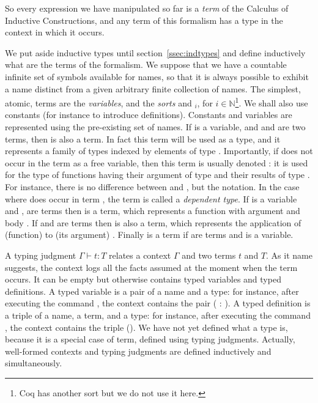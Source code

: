 So every expression we have manipulated so far is a \emph{term} of the
Calculus of Inductive Constructions, and any term of this formalism
has a type in the context in which it occurs.

We put aside inductive types until section~\ref{ssec:indtypes} and define
inductively what are the terms of the formalism. We suppose that we
have a countable infinite set of symbols available for names, so that it is
always possible to exhibit a name distinct from a given arbitrary
finite collection of names. The simplest, atomic, terms are the
\emph{variables}, and the \emph{sorts}  and $_i$, for
$i \in \mathbb{N}$\footnote{Coq has
another sort  but we do not use it here.}. We shall also
use constants (for instance to introduce definitions). Constants and
variables are represented using the pre-existing set of names. If  is a
variable, and  and  are two terms, then  is
also a term. In fact this term will be used as a type, and it
represents a family of types  indexed by elements of type .
Importantly, if  does not occur in the term  as a
free variable, then this term is usually denoted : it is
used for the type of functions having their argument of type  and
their results of type . For instance, there is no difference
between  and , but the
notation. In the case where  does occur in term , the term
 is called a \emph{dependent type}.
If  is a variable and , 
are terms then  is a term, which represents a function
with argument  and body . If  and  are terms then
 is also a term, which represents the application of (function)
 to (its argument) . Finally  is a term
if  are terms and  is a variable.

A typing judgment $\Gamma \vdash t : T$ relates a
context $\Gamma$ and two terms $t$ and $T$. As it name suggests,
the context logs all the facts assumed at the moment when the term
occurs. It can be empty but otherwise contains typed variables and
typed definitions. A typed variable is a pair of a name and a
type: for instance, after executing the command ,
the context contains the pair ( : ). A typed definition is
a triple of a name, a term, and a type: for instance, after executing
the command , the context contains the
triple (). We have not yet defined what a
type is, because it is a special case of term, defined using typing
judgments. Actually, well-formed contexts and typing judgments are
defined inductively and simultaneously.

